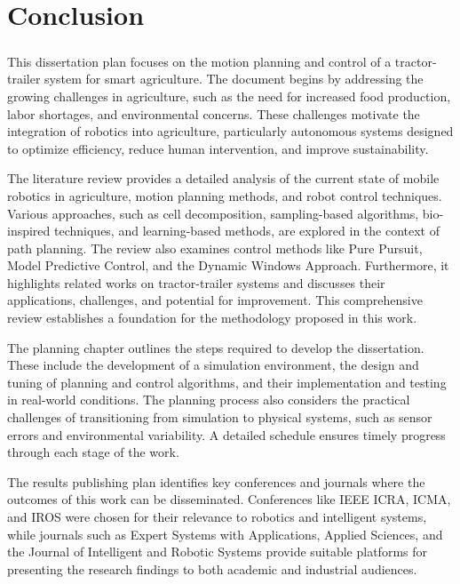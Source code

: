 
%

\chapter{Conclusion}
\label{cha:conclusion}

\paragraph{}This dissertation plan focuses on the motion planning and control of a 
tractor-trailer system for smart agriculture. The document begins by addressing 
the growing challenges in agriculture, such as the need for increased food 
production, labor shortages, and environmental concerns. These challenges motivate 
the integration of robotics into agriculture, particularly autonomous systems 
designed to optimize efficiency, reduce human intervention, and improve 
sustainability.


The literature review provides a detailed analysis of the current state of mobile 
robotics in agriculture, motion planning methods, and robot control techniques. 
Various approaches, such as cell decomposition, sampling-based algorithms, 
bio-inspired techniques, and learning-based methods, are explored in the context of 
path planning. The review also examines control methods like Pure Pursuit, Model 
Predictive Control, and the Dynamic Windows Approach. Furthermore, it highlights 
related works on tractor-trailer systems and discusses their applications, 
challenges, and potential for improvement. This comprehensive review establishes a 
foundation for the methodology proposed in this work.

The planning chapter outlines the steps required to develop the dissertation. 
These include the development of a simulation environment, the design 
and tuning of planning and control algorithms, and their implementation and testing 
in real-world conditions. The planning process also considers the practical 
challenges of transitioning from simulation to physical systems, such as sensor 
errors and environmental variability. A detailed schedule ensures timely progress 
through each stage of the work.

The results publishing plan identifies key conferences and journals where the 
outcomes of this work can be disseminated. Conferences like IEEE ICRA, ICMA, and 
IROS were chosen for their relevance to robotics and intelligent systems, while 
journals such as Expert Systems with Applications, Applied Sciences, and the 
Journal of Intelligent and Robotic Systems provide suitable platforms for 
presenting the research findings to both academic and industrial audiences.

